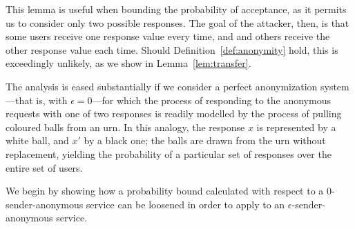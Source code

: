 \documentclass[USenglish]{llncs}
\begin{document}
This lemma is useful when bounding the probability of acceptance,
as it permits us to consider only two possible responses.  The goal
of the attacker, then, is that some users receive one response value
every time, and and others receive the
other response value each time.  Should Definition~\ref{def:anonymity}
hold, this is exceedingly unlikely, as we show in Lemma~\ref{lem:transfer}.

The analysis is eased substantially if we consider a perfect anonymization
system---that is, with $\epsilon = 0$---for which
the process of responding to the anonymous requests with one of two
responses is readily modelled by the process of pulling coloured balls from
an urn.  In this analogy, the response $x$ is represented by a white ball,
and $x'$ by a black one; the balls are drawn from the urn without replacement,
yielding the probability of a particular set of responses over the entire
set of users.

We begin by showing how a probability bound calculated with respect to a
$0$-sender-anonymous service can be loosened in order to apply to an
$\epsilon$-sender-anonymous service.
\end{document}
